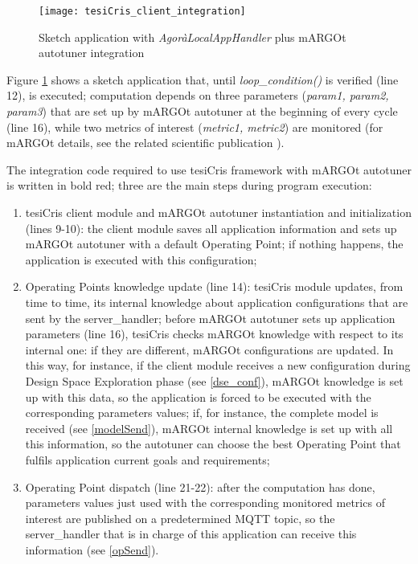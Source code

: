 \begin{figure}[H]

    \centering
    \texttt{[image: tesiCris\_client\_integration]}
    \caption{Sketch application with \textit{AgoràLocalAppHandler} plus mARGOt autotuner integration}
    \label{fig::sketchApp}
    
\end{figure}

Figure \ref{fig::sketchApp} shows a sketch application that, until \textit{loop\_condition()} is verified (line 12), is executed; computation depends on three parameters (\textit{param1, param2, param3}) that are set up by mARGOt autotuner at the beginning of every cycle (line 16), while two metrics of interest (\textit{metric1, metric2}) are monitored (for mARGOt details, see the related scientific publication \cite{gadioli2015application}).

The integration code required to use tesiCris framework with mARGOt autotuner is written in bold red; three are the main steps during program execution:

\begin{enumerate}

    \item tesiCris client module and mARGOt autotuner instantiation and initialization (lines 9-10): the client module saves all application information and sets up mARGOt autotuner with a default Operating Point; if nothing happens, the application is executed with this configuration;
    
    \item Operating Points knowledge update (line 14): tesiCris module updates, from time to time, its internal knowledge about application configurations that are sent by the server\_handler; before mARGOt autotuner sets up application parameters (line 16), tesiCris checks mARGOt knowledge with respect to its internal one: if they are different, mARGOt configurations are updated. In this way, for instance, if the client module receives a new configuration during Design Space Exploration phase (see \ref{dse_conf}), mARGOt knowledge is set up with this data, so the application is forced to be executed with the corresponding parameters values; if, for instance, the complete model is received (see \ref{modelSend}), mARGOt internal knowledge is set up with all this information, so the autotuner can choose the best Operating Point that fulfils application current goals and requirements;
    
    \item Operating Point dispatch (line 21-22): after the computation has done, parameters values just used with the corresponding monitored metrics of interest are published on a predetermined MQTT topic, so the server\_handler that is in charge of this application can receive this information (see \ref{opSend}).
    
\end{enumerate}
